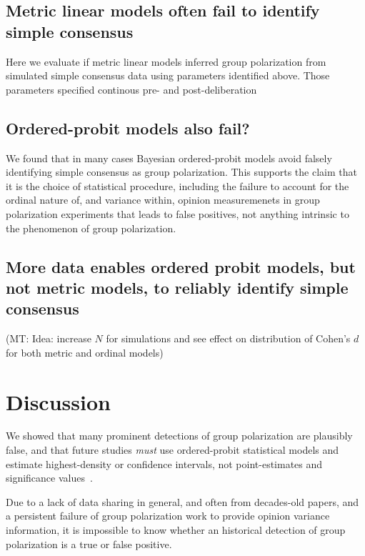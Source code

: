 \documentclass[11pt, letterpaper]{article}
\newcommand{\mt}[1]{{\textcolor{myorange} {({\tiny MT:} #1)}}}
\begin{document}
\subsection{Metric linear models often fail to identify simple consensus}


Here we evaluate if metric linear models inferred group polarization from
simulated simple consensus data using parameters identified above. Those
parameters specified continous pre- and post-deliberation 

% 

\subsection{Ordered-probit models also fail?}

We found that in many cases Bayesian ordered-probit models avoid falsely identifying simple
consensus as group polarization. This supports the claim that it is the choice of statistical
procedure, including the failure to account for the ordinal nature of, and variance within,
opinion measuremenets in group polarization experiments that leads to false
positives, not anything intrinsic to the phenomenon of group polarization.


\subsection{More data enables ordered probit models, but not metric models, to reliably
  identify simple consensus}

  \mt{Idea: increase $N$ for simulations and see effect on distribution of Cohen's $d$
  for both metric and ordinal models}


\section{Discussion}

We showed that many prominent detections of group polarization are plausibly
false, and that future studies \emph{must} use ordered-probit statistical
models and estimate highest-density or confidence intervals, not point-estimates 
and significance values~\cite{Meehl1997}.

Due to a lack of data sharing in general, and often from decades-old papers, and a persistent 
failure of group polarization work to provide opinion variance information, 
it is impossible to know whether an historical detection of group polarization
is a true or false positive. 
\end{document}
